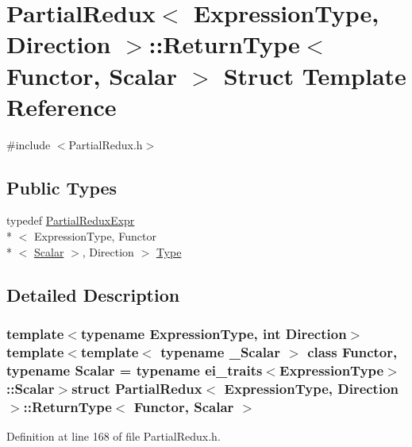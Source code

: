 \hypertarget{struct_partial_redux_1_1_return_type}{\section{Partial\-Redux$<$ Expression\-Type, Direction $>$\-:\-:Return\-Type$<$ Functor, Scalar $>$ Struct Template Reference}
\label{struct_partial_redux_1_1_return_type}
}


{\ttfamily \#include $<$Partial\-Redux.\-h$>$}

\subsection*{Public Types}
\begin{DoxyCompactItemize}
\item 
typedef \hyperlink{class_partial_redux_expr}{Partial\-Redux\-Expr}\\*
$<$ Expression\-Type, Functor\\*
$<$ \hyperlink{class_partial_redux_a5884ea45b5cd9ba86feef9193cf56fa8}{Scalar} $>$, Direction $>$ \hyperlink{struct_partial_redux_1_1_return_type_a514615b437d3469f7dff4e21a7d2c863}{Type}
\end{DoxyCompactItemize}


\subsection{Detailed Description}
\subsubsection*{template$<$typename Expression\-Type, int Direction$>$template$<$template$<$ typename \-\_\-\-Scalar $>$ class Functor, typename Scalar = typename ei\-\_\-traits$<$\-Expression\-Type$>$\-::\-Scalar$>$struct Partial\-Redux$<$ Expression\-Type, Direction $>$\-::\-Return\-Type$<$ Functor, Scalar $>$}



Definition at line 168 of file Partial\-Redux.\-h.



